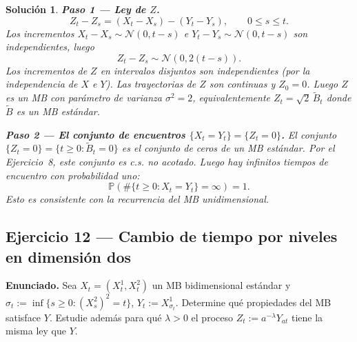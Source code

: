 \documentclass[12pt,letterpaper]{article}
\theoremstyle{ejercicio}
\theoremstyle{solucion}
\newtheorem*{solucion}{Solución}
\renewcommand{\P}{\mathbb{P}}
\begin{document}
\begin{solucion}

\textbf{Paso 1 — Ley de $Z$.}
\[
  Z_t - Z_s = (X_t-X_s)-(Y_t-Y_s),\qquad 0\le s\le t.
\]
Los incrementos $X_t-X_s\sim\mathcal{N}(0,t-s)$ e $Y_t-Y_s\sim\mathcal{N}(0,t-s)$ son independientes, luego
\[
  Z_t-Z_s \sim\mathcal{N}(0,2(t-s)).
\]
Los incrementos de $Z$ en intervalos disjuntos son independientes (por la independencia de $X$ e $Y$).
Las trayectorias de $Z$ son continuas y $Z_0=0$.
Luego $Z$ es un MB con parámetro de varianza $\sigma^2=2$, equivalentemente $Z_t=\sqrt{2}\,\tilde B_t$
donde $\tilde B$ es un MB estándar.

\textbf{Paso 2 — El conjunto de encuentros $\{X_t=Y_t\}=\{Z_t=0\}$.}
El conjunto $\{Z_t=0\}=\{t\ge 0:\tilde B_t=0\}$ es el conjunto de ceros de un MB estándar.
Por el Ejercicio~8, este conjunto es c.s. no acotado. Luego hay infinitos tiempos de encuentro
con probabilidad uno:
\[
  \P\!\left(\#\{t\ge 0:X_t=Y_t\}=\infty\right)=1.
\]
Esto es consistente con la recurrencia del MB unidimensional.
\end{solucion}

\subsection*{Ejercicio 12 — Cambio de tiempo por niveles en dimensión dos}

\begin{recuadro}
\textbf{Enunciado.} Sea $X_t=(X^1_t,X^2_t)$ un MB bidimensional estándar y
$\sigma_t:=\inf\{s\ge 0:(X^2_s)^2=t\}$, $Y_t:=X^1_{\sigma_t}$.
Determine qué propiedades del MB satisface $Y$. Estudie además para qué $\lambda>0$
el proceso $Z_t:=a^{-\lambda}Y_{at}$ tiene la misma ley que $Y$.
\end{recuadro}
\end{document}
